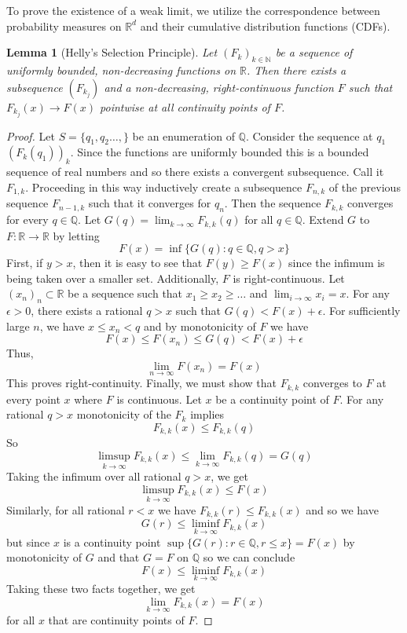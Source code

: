 \documentclass[11pt]{amsart}
\newtheorem{lemma}[theorem]{Lemma}         %
\theoremstyle{definition}                  %
\theoremstyle{remark}                      %
\begin{document}
To prove the existence of a weak limit, we utilize the correspondence between probability measures on $\mathbb{R}^d$ and their cumulative distribution functions (CDFs). 

\begin{lemma}[Helly's Selection Principle]\label{lemma:helly}
    Let $(F_k)_{k \in \mathbb{N}}$ be a sequence of uniformly bounded, non-decreasing functions on $\mathbb{R}$. Then there exists a subsequence $(F_{k_j})$ and a non-decreasing, right-continuous function $F$ such that $F_{k_j}(x) \to F(x)$ pointwise at all continuity points of $F$.
\end{lemma}

\begin{proof}
    Let $S = \{q_1,q_2\dots,\}$ be an enumeration of $ \mathbb{Q}$. Consider the sequence at $q_1$
    $(F_k(q_1))_k$. Since the functions are uniformly bounded this is a bounded sequence of real numbers and
    so there exists a convergent subsequence. Call it $F_{1,k}$. Proceeding in this way inductively
    create a subsequence $F_{n,k}$ of the previous sequence  $F_{n-1,k}$ such that it converges for  $q_n$.
    Then the sequence  $F_{k,k}$ converges for every  $q \in \mathbb{Q}$. Let $G(q) = \lim_{k\to \infty}F_{k,k}(q)$ for all $q \in \mathbb{Q}$.
    Extend $G$ to $F : \mathbb{R} \rightarrow \mathbb{R}$ by letting
    \[
        F(x) = \inf \{G(q) : q \in \mathbb{Q}, q > x \}
    \] 
    First, if $y > x$, then it is easy to see that  $F(y) \ge F(x)$ since the infimum is being taken over a smaller set.
    Additionally, $F$ is right-continuous. Let $(x_n)_n \subset \mathbb{R}$ be a sequence such that $x_1 \ge x_2 \ge \dots$ and $\lim_{i\to \infty}x_i = x$.
    For any $\epsilon > 0$, there exists a rational $q > x$ such that  $G(q) < F(x) + \epsilon$. For sufficiently large $n$,
    we have $x \le x_n < q$ and by monotonicity of  $F$ we have
     \[
    F(x) \le F(x_n) \le G(q) < F(x) + \epsilon
    \] 
    Thus,
    \[
    \lim_{n\to \infty} F(x_n) = F(x)
    \] 
    This proves right-continuity.
    Finally, we must show that $F_{k,k}$ converges to $F$ at every point $x$ where  $F$ is continuous.
    Let $x$ be a continuity point of $F$. For any rational  $q > x$ monotonicity of the $F_k$  implies
    \[
        F_{k,k}(x) \le F_{k,k}(q)
    \] 
    So 
    \[
        \limsup_{k\to \infty}F_{k,k}(x) \le \lim_{k\to \infty}F_{k,k}(q) = G(q)
    \] 
    Taking the infimum over all rational $q > x$, we get
     \[
         \limsup_{k\to \infty}F_{k,k}(x) \le F(x)
    \] 
    Similarly, for all rational $r < x$ we have  $F_{k,k}(r) \le F_{k,k}(x)$ and so we have
     \[
         G(r) \le \liminf_{k\to \infty} F_{k,k}(x)
    \] 
    but since $x$ is a continuity point $\sup\{G(r) : r \in \mathbb{Q}, r \le x\} = F(x)$ by monotonicity of $G$ and that  $G = F$ on  $ \mathbb{Q}$ 
    so we can conclude
    \[
        F(x) \le \liminf_{k\to \infty} F_{k,k}(x)
    \] 
    Taking these two facts together, we get
    \[
        \lim_{k\to \infty}F_{k,k}(x) = F(x)
    \] 
    for all $x$ that are continuity points of $F$.
\end{proof}
\end{document}
